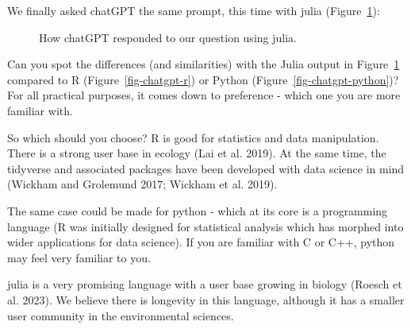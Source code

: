 \documentclass[
  letterpaper,
]{krantz}
\begin{document}
We finally asked chatGPT the same prompt, this time with julia
(Figure~\ref{fig-chatgpt-julia}):

\begin{figure}


\caption{\label{fig-chatgpt-julia}How chatGPT responded to our question
using julia.}

\end{figure}%

Can you spot the differences (and similarities) with the Julia output in
Figure~\ref{fig-chatgpt-julia} compared to R
(Figure~\ref{fig-chatgpt-r}) or Python
(Figure~\ref{fig-chatgpt-python})? For all practical purposes, it comes
down to preference - which one you are more familiar with.

So which should you choose? R is good for statistics and data
manipulation. There is a strong user base in ecology (Lai et al. 2019).
At the same time, the tidyverse and associated packages have been
developed with data science in mind (Wickham and Grolemund 2017; Wickham
et al. 2019).

The same case could be made for python - which at its core is a
programming language (R was initially designed for statistical analysis
which has morphed into wider applications for data science). If you are
familiar with C or C++, python may feel very familiar to you.

julia is a very promising language with a user base growing in biology
(Roesch et al. 2023). We believe there is longevity in this language,
although it has a smaller user community in the environmental sciences.
\end{document}
